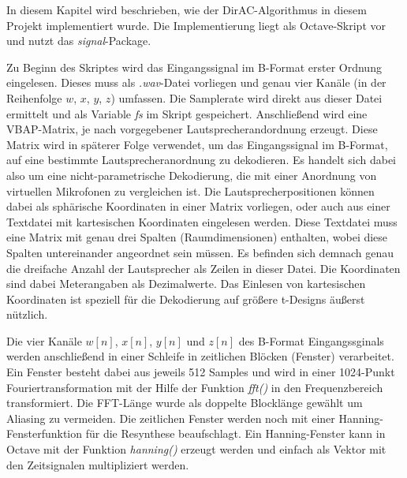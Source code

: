 In diesem Kapitel wird beschrieben, wie der DirAC-Algorithmus in diesem Projekt implementiert wurde. Die Implementierung liegt als Octave-Skript vor und nutzt das \textit{signal}-Package.

Zu Beginn des Skriptes wird das Eingangssignal im B-Format erster Ordnung eingelesen. Dieses muss als \textit{.wav}-Datei vorliegen und genau vier Kanäle (in der Reihenfolge $w$, $x$, $y$, $z$) umfassen. Die Samplerate wird direkt aus dieser Datei ermittelt und als Variable \textit{fs} im Skript gespeichert. Anschließend wird eine VBAP-Matrix, je nach vorgegebener Lautsprecherandordnung erzeugt. Diese Matrix wird in späterer Folge verwendet, um das Eingangssignal im B-Format, auf eine bestimmte Lautsprecheranordnung zu dekodieren. Es handelt sich dabei also um eine nicht-parametrische Dekodierung, die mit einer Anordnung von virtuellen Mikrofonen zu vergleichen ist. Die Lautsprecherpositionen können dabei als sphärische Koordinaten in einer Matrix vorliegen, oder auch aus einer Textdatei mit kartesischen Koordinaten eingelesen werden. Diese Textdatei muss eine Matrix mit genau drei Spalten (Raumdimensionen) enthalten, wobei diese Spalten untereinander angeordnet sein müssen. Es befinden sich demnach genau die dreifache Anzahl der Lautsprecher als Zeilen in dieser Datei. Die Koordinaten sind dabei Meterangaben als Dezimalwerte. Das Einlesen von kartesischen Koordinaten ist speziell für die Dekodierung auf größere t-Designs äußerst nützlich.

Die vier Kanäle $w[n]$, $x[n]$, $y[n]$ und $z[n]$ des B-Format Eingangssginals werden anschließend in einer Schleife in zeitlichen Blöcken (Fenster) verarbeitet. Ein Fenster besteht dabei aus jeweils 512 Samples und wird in einer 1024-Punkt Fouriertransformation mit der Hilfe der Funktion \textit{fft()} in den Frequenzbereich transformiert. Die FFT-Länge wurde als doppelte Blocklänge gewählt um Aliasing zu vermeiden. Die zeitlichen Fenster werden noch mit einer Hanning-Fensterfunktion für die Resynthese beaufschlagt. Ein Hanning-Fenster kann in Octave mit der Funktion \textit{hanning()} erzeugt werden und einfach als Vektor mit den Zeitsignalen multipliziert werden.
